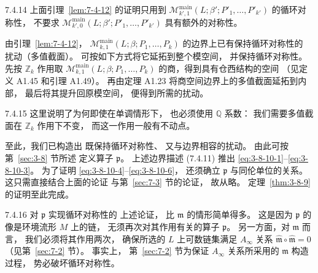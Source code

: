 \begin{remark}{7.4.14}\label{rem:7-4-14}
上面引理~\ref{lem:7-4-12}
的证明只用到
\(
\mathcal M^{\mathrm{main}}_{k',1}
(L;\beta';P'_1,\ldots,P'_{k'})
\)
的循环对称性，
不要求
\(
\mathcal M^{\mathrm{main}}_{k',0}
(L;\beta';P'_1,\ldots,P'_{k'})
\)
具有额外的对称性。
\end{remark}

由引理~\ref{lem:7-4-12}，
\(
\mathcal M^{\mathrm{main}}_{k,1}
(L;\beta;P_1,\ldots,P_k)
\)
的边界上已有保持循环对称性的
扰动（多值截面）。
可按如下方式将它延拓到整个模空间，
并保持循环对称性。
先按 \(\mathbb Z_k\) 作用取
\(
\mathcal M^{\mathrm{main}}_{k,1}
(L;\beta;P_1,\ldots,P_k)
\)
的商，得到具有仓西结构的空间
（见定义 A1.45 和引理 A1.49）。
再由定理 A1.23
将商空间边界上的多值截面延拓到内部，
最后将其提升回原模空间，
便得到所需的扰动。

\begin{remark}{7.4.15}\label{rem:7-4-15}
这里说明了为何即使在单调情形下，
也必须使用 \(\mathbb Q\) 系数：
我们需要多值截面在 \(\mathbb Z_k\)
作用下不变，
而这一作用一般有不动点。
\end{remark}

至此，我们已构造出
既保持循环对称性、
又与边界相容的扰动。
由此可按第~\ref{sec:3-8} 节所述
定义算子 \(\mathfrak p\)。
上述边界描述 (7.4.11)
推出
\eqref{eq:3-8-10-1}--\eqref{eq:3-8-10-3}。
为了证明
\eqref{eq:3-8-10-4}--\eqref{eq:3-8-10-6}，
还须确立 \(\mathfrak p\)
与同伦单位的关系。
这只需直接结合上面的论证
与第~\ref{sec:7-3} 节的论证，
故从略。
定理~\ref{thm:3-8-9}
的证明至此完成。

\begin{remark}{7.4.16}\label{rem:7-4-16}
对 \(\mathfrak p\) 实现循环对称性的
上述论证，
比 \(\mathfrak m\) 的情形简单得多。
这是因为
\(\mathfrak p\) 的像是环境流形 \(M\)
上的链，
无须再次对其作用有关的算子
\(\mathfrak p\)。
另一方面，对 \(\mathfrak m\) 而言，
我们必须将其作用两次，
确保所选的 \(L\) 上可数链集满足
\(A_\infty\) 关系
\(\widehat{\mathfrak m}\circ
\widehat{\mathfrak m}=0\)
（见第~\ref{sec:7-2} 节）。
事实上，
第~\ref{sec:7-2} 节为保证
\(A_\infty\) 关系所采用的
\(\mathfrak m\) 构造过程，
势必破坏循环对称性。
\end{remark}
